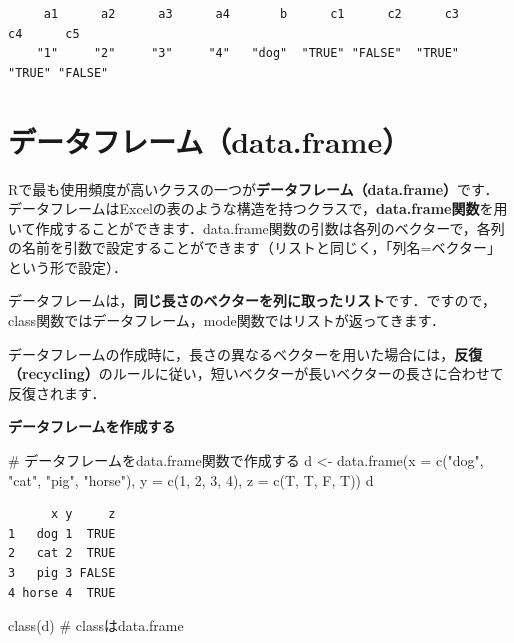 \documentclass[
  letterpaper,
  DIV=11,
  numbers=noendperiod]{scrreprt}
\newenvironment{Shaded}{\begin{snugshade}}{\end{snugshade}}
\newcommand{\AttributeTok}[1]{\textcolor[rgb]{0.40,0.45,0.13}{#1}}
\newcommand{\CommentTok}[1]{\textcolor[rgb]{0.37,0.37,0.37}{#1}}
\newcommand{\DecValTok}[1]{\textcolor[rgb]{0.68,0.00,0.00}{#1}}
\newcommand{\FunctionTok}[1]{\textcolor[rgb]{0.28,0.35,0.67}{#1}}
\newcommand{\NormalTok}[1]{\textcolor[rgb]{0.00,0.23,0.31}{#1}}
\newcommand{\OtherTok}[1]{\textcolor[rgb]{0.00,0.23,0.31}{#1}}
\newcommand{\StringTok}[1]{\textcolor[rgb]{0.13,0.47,0.30}{#1}}
\begin{document}
\begin{verbatim}
     a1      a2      a3      a4       b      c1      c2      c3      c4      c5 
    "1"     "2"     "3"     "4"   "dog"  "TRUE" "FALSE"  "TRUE"  "TRUE" "FALSE" 
\end{verbatim}

\hypertarget{ux30c7ux30fcux30bfux30d5ux30ecux30fcux30e0data.frame-1}{%
\section{データフレーム（data.frame）}\label{ux30c7ux30fcux30bfux30d5ux30ecux30fcux30e0data.frame-1}}

Rで最も使用頻度が高いクラスの一つが\textbf{データフレーム（data.frame）}です．データフレームはExcelの表のような構造を持つクラスで，\textbf{data.frame関数}を用いて作成することができます．data.frame関数の引数は各列のベクターで，各列の名前を引数で設定することができます（リストと同じく，「列名=ベクター」という形で設定）．

データフレームは，\textbf{同じ長さのベクターを列に取ったリスト}です．ですので，class関数ではデータフレーム，mode関数ではリストが返ってきます．

データフレームの作成時に，長さの異なるベクターを用いた場合には，\textbf{反復（recycling）}のルールに従い，短いベクターが長いベクターの長さに合わせて反復されます．

\textbf{データフレームを作成する}

\begin{Shaded}
\begin{Highlighting}[]
\CommentTok{\# データフレームをdata.frame関数で作成する}
\NormalTok{d }\OtherTok{\textless{}{-}} \FunctionTok{data.frame}\NormalTok{(}\AttributeTok{x =} \FunctionTok{c}\NormalTok{(}\StringTok{"dog"}\NormalTok{, }\StringTok{"cat"}\NormalTok{, }\StringTok{"pig"}\NormalTok{, }\StringTok{"horse"}\NormalTok{), }\AttributeTok{y =} \FunctionTok{c}\NormalTok{(}\DecValTok{1}\NormalTok{, }\DecValTok{2}\NormalTok{, }\DecValTok{3}\NormalTok{, }\DecValTok{4}\NormalTok{), }\AttributeTok{z =} \FunctionTok{c}\NormalTok{(T, T, F, T))}
\NormalTok{d}
\end{Highlighting}
\end{Shaded}

\begin{verbatim}
      x y     z
1   dog 1  TRUE
2   cat 2  TRUE
3   pig 3 FALSE
4 horse 4  TRUE
\end{verbatim}

\begin{Shaded}
\begin{Highlighting}[]
\FunctionTok{class}\NormalTok{(d) }\CommentTok{\# classはdata.frame}
\end{Highlighting}
\end{Shaded}
\end{document}
